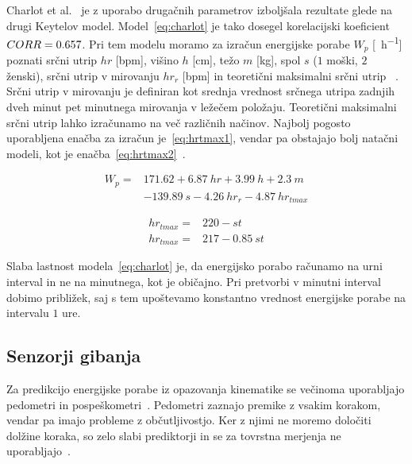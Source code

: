 Charlot et al.~\cite{charlot2014improvement} je z uporabo drugačnih parametrov izboljšala rezultate glede na drugi Keytelov model. Model~\eqref{eq:charlot} je tako dosegel korelacijski koeficient ${CORR}= \num{0.657}$. Pri tem modelu moramo za izračun energijske porabe $W_p$ [\si{\kcal\per\hour}]  poznati srčni utrip $hr$ [\si{bpm}], višino $h$ [\si{\cm}], težo $m$ [\si{\kg}], spol $s$ ($1$ moški, $2$ ženski), srčni utrip v mirovanju $hr_r$ [\si{bpm}] in teoretični maksimalni srčni utrip \hrtmax [\si{bpm}]~\cite{charlot2014improvement}. Srčni utrip v mirovanju je definiran kot srednja vrednost srčnega utripa zadnjih dveh minut pet minutnega mirovanja v ležečem položaju. Teoretični maksimalni srčni utrip lahko izračunamo na več različnih načinov. Najbolj pogosto uporabljena enačba za izračun je~\eqref{eq:hrtmax1}, vendar pa obstajajo bolj natačni modeli, kot je enačba~\eqref{eq:hrtmax2}~\cite{miller1993predicting}. 

\begin{align}\label{eq:charlot}
W_p = & \num{171.62} + \num{6.87}~hr + \num{3.99}~h + \num{2.3}~m \nonumber \\
& - \num{139.89}~s - \num{4.26}~hr_r - \num{4.87}~hr_{tmax}
\end{align}

\begin{align}
	hr_{tmax} = & \num{220} - st \label{eq:hrtmax1}\\ 
    hr_{tmax} = & 217 - \num{0.85}~st \label{eq:hrtmax2}
\end{align}

Slaba lastnost modela~\eqref{eq:charlot} je, da energijsko porabo računamo na urni interval in ne na minutnega, kot je običajno. Pri pretvorbi v minutni interval dobimo približek, saj s tem upoštevamo konstantno vrednost energijske porabe na intervalu $1$ ure. 





\subsection{Senzorji gibanja}\label{sec:senzorji-gibanja}

Za predikcijo energijske porabe iz opazovanja kinematike se večinoma uporabljajo pedometri in pospeškometri~\cite{levine2005measurement}. Pedometri zaznajo premike z vsakim korakom, vendar pa imajo probleme z občutljivostjo. Ker z njimi ne moremo določiti dolžine koraka, so zelo slabi prediktorji in se za tovrstna merjenja ne uporabljajo~\cite{levine2005measurement}.

